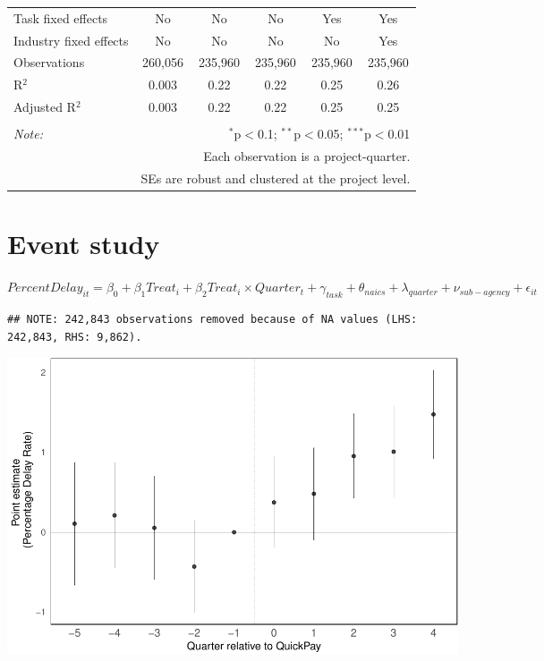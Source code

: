 \documentclass[
]{article}
\begin{document}
\begin{table}[H]
\begin{tabular}{@{\extracolsep{-2pt}}lccccc}
Task fixed effects & No & No & No & Yes & Yes \\ 
Industry fixed effects & No & No & No & No & Yes \\ 
Observations & 260,056 & 235,960 & 235,960 & 235,960 & 235,960 \\ 
R$^{2}$ & 0.003 & 0.22 & 0.22 & 0.25 & 0.26 \\ 
Adjusted R$^{2}$ & 0.003 & 0.22 & 0.22 & 0.25 & 0.25 \\ 
\hline 
\hline \\[-1.8ex] 
\textit{Note:}  & \multicolumn{5}{r}{$^{*}$p$<$0.1; $^{**}$p$<$0.05; $^{***}$p$<$0.01} \\ 
 & \multicolumn{5}{r}{Each observation is a project-quarter.} \\ 
 & \multicolumn{5}{r}{SEs are robust and clustered at the project level.} \\ 
\end{tabular} 
\end{table}

\hypertarget{event-study}{%
\section{Event study}\label{event-study}}

\(PercentDelay_{it}=\beta_0 + \beta_1 Treat_i + \beta_2 Treat_i \times Quarter_t + \gamma_{task} + \theta_{naics}+\lambda_{quarter}+\nu_{sub-agency}+\epsilon_{it}\)

\begin{verbatim}
## NOTE: 242,843 observations removed because of NA values (LHS: 242,843, RHS: 9,862).
\end{verbatim}

\includegraphics{qp_first_pc_delay-2_files/figure-latex/event_study-1.pdf}
\end{document}
